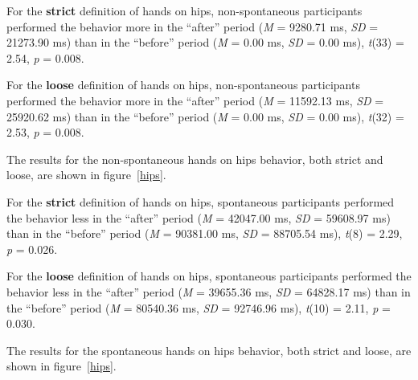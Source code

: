 \documentclass{acm_proc_article-sp}
\begin{document}
For the \textbf{strict} definition of hands on hips, non-spontaneous participants performed the behavior more in the ``after'' period (\textit{M} = 9280.71 ms, \textit{SD} = 21273.90 ms) than in the ``before'' period (\textit{M} = 0.00 ms, \textit{SD} = 0.00 ms), \textit{t}(33) = 2.54, \textit{p} = 0.008.

For the \textbf{loose} definition of hands on hips, non-spontaneous participants performed the behavior more in the ``after'' period (\textit{M} = 11592.13 ms, \textit{SD} = 25920.62 ms) than in the ``before'' period (\textit{M} = 0.00 ms, \textit{SD} = 0.00 ms), \textit{t}(32) = 2.53, \textit{p} = 0.008.

The results for the non-spontaneous hands on hips behavior, both strict and loose, are shown in figure~\ref{hips}.

For the \textbf{strict} definition of hands on hips, spontaneous participants performed the behavior less in the ``after'' period (\textit{M} = 42047.00 ms, \textit{SD} = 59608.97 ms) than in the ``before'' period (\textit{M} = 90381.00 ms, \textit{SD} = 88705.54 ms), \textit{t}(8) = 2.29, \textit{p} = 0.026.

For the \textbf{loose} definition of hands on hips, spontaneous participants performed the behavior less in the ``after'' period (\textit{M} = 39655.36 ms, \textit{SD} = 64828.17 ms) than in the ``before'' period (\textit{M} = 80540.36 ms, \textit{SD} = 92746.96 ms), \textit{t}(10) = 2.11, \textit{p} = 0.030.

The results for the spontaneous hands on hips behavior, both strict and loose, are shown in figure~\ref{hips}.
\end{document}

